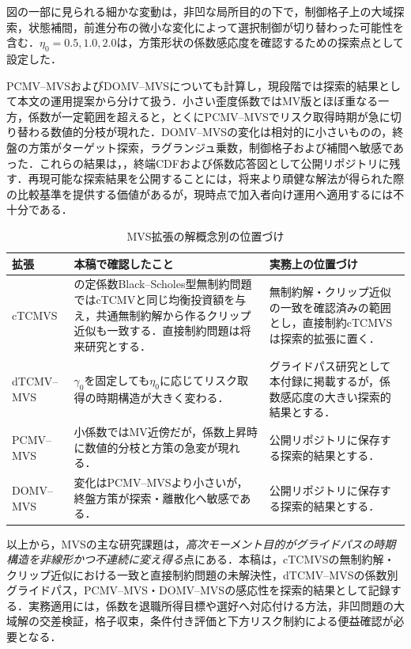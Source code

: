 \documentclass[10pt,a4paper]{article}
\theoremstyle{plain}
\theoremstyle{definition}
\begin{document}
図の一部に見られる細かな変動は，非凹な局所目的の下で，制御格子上の大域探索，状態補間，前進分布の微小な変化によって選択制御が切り替わった可能性を含む．$\eta_0=0.5,1.0,2.0$は，方策形状の係数感応度を確認するための探索点として設定した．

PCMV--MVSおよびDOMV--MVSについても計算し，現段階では探索的結果として本文の運用提案から分けて扱う．小さい歪度係数ではMV版とほぼ重なる一方，係数が一定範囲を超えると，とくにPCMV--MVSでリスク取得時期が急に切り替わる数値的分枝が現れた．DOMV--MVSの変化は相対的に小さいものの，終盤の方策がターゲット探索，ラグランジュ乗数，制御格子および補間へ敏感であった．これらの結果は，，終端CDFおよび係数応答図として公開リポジトリに残す．再現可能な探索結果を公開することには，将来より頑健な解法が得られた際の比較基準を提供する価値があるが，現時点で加入者向け運用へ適用するには不十分である．

\begin{table}[htbp]
\centering\small
\caption{MVS拡張の解概念別の位置づけ}
\label{tab:mvs-positioning}
\begin{tabularx}{\textwidth}{>{\raggedright\arraybackslash}p{25mm}>{\raggedright\arraybackslash}p{48mm}>{\raggedright\arraybackslash}X}
\toprule
拡張 & 本稿で確認したこと & 実務上の位置づけ \\
\midrule
cTCMVS
& \citet{MuTianYang2019}の定係数Black--Scholes型無制約問題ではcTCMVと同じ均衡投資額を与え，共通無制約解から作るクリップ近似も一致する．直接制約問題は将来研究とする．
& 無制約解・クリップ近似の一致を確認済みの範囲とし，直接制約cTCMVSは探索的拡張に置く．\\
dTCMV--MVS
& $\gamma_0$を固定しても$\eta_0$に応じてリスク取得の時期構造が大きく変わる．
& グライドパス研究として本付録に掲載するが，係数感応度の大きい探索的結果とする．\\
PCMV--MVS
& 小係数ではMV近傍だが，係数上昇時に数値的分枝と方策の急変が現れる．
& 公開リポジトリに保存する探索的結果とする．\\
DOMV--MVS
& 変化はPCMV--MVSより小さいが，終盤方策が探索・離散化へ敏感である．
& 公開リポジトリに保存する探索的結果とする．\\
\bottomrule
\end{tabularx}
\end{table}

以上から，MVSの主な研究課題は，\emph{高次モーメント目的がグライドパスの時期構造を非線形かつ不連続に変え得る}点にある．本稿は，cTCMVSの無制約解・クリップ近似における一致と直接制約問題の未解決性，dTCMV--MVSの係数別グライドパス，PCMV--MVS・DOMV--MVSの感応性を探索的結果として記録する．実務適用には，係数を退職所得目標や選好へ対応付ける方法，非凹問題の大域解の交差検証，格子収束，条件付き評価と下方リスク制約による便益確認が必要となる．
\end{document}
